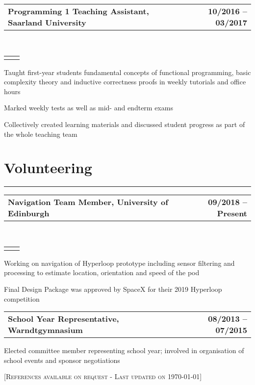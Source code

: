 \documentclass[]{deedy-resume}
\makeatletter
\newcommand{\headerrow}[2]
{\begin{tabular*}{\linewidth}{l@{\extracolsep{\fill}}r}
	\fontspec{Helvetica}\fontsize{12pt}{12pt}\selectfont\bfseries{\color{subheadings}#1} &
	\fontspec{Helvetica}\fontsize{12pt}{12pt}\selectfont\bfseries{\color{subheadings}#2} \\
\end{tabular*}}
\newcommand{\locationrow}[2]
{\begin{tabular*}{\linewidth}{l@{\extracolsep{\fill}}r}
        \color{headings}\scshape\fontspec{Heiti TC Medium}\fontsize{10pt}{12pt}\selectfont{#1}  &
        \color{headings}\scshape\fontspec{Heiti TC Medium}\fontsize{10pt}{12pt}\selectfont{#2}  \\
\end{tabular*}}
\makeatother
\begin{document}
\noindent
\headerrow{Programming 1 Teaching Assistant, Saarland University}{10/2016 -- 03/2017}
\\
\locationrow{Dependable Systems and Software Group}{}
\begin{tightitemize}{1.7em}
    \item Taught first-year students fundamental concepts of functional programming, basic complexity theory and inductive correctness proofs in weekly tutorials and office hours
    \item Marked weekly tests as well as mid- and endterm exams
    \item Collectively created learning materials and discussed student progress as part of the whole teaching team
\end{tightitemize}
\largesectionsep


\section*{Volunteering}
\hrule
\vspace{0.4em}

\noindent
\headerrow{Navigation Team Member, University of Edinburgh}{09/2018 -- Present}
\\
\locationrow{HYPED -- University of Edinburgh Hyperloop Society}{}
\begin{tightitemize}{1.7em}
    \item Working on navigation of Hyperloop prototype including sensor filtering and processing
    to estimate location, orientation and speed of the pod
    \item Final Design Package was approved by SpaceX for their 2019 Hyperloop competition
\end{tightitemize}
\largesectionsep


\noindent
\headerrow{School Year Representative, Warndtgymnasium}{08/2013 -- 07/2015}
\begin{tightitemize}{1.7em}
    \item Elected committee member representing school year; involved in organisation of school events and sponsor
    negotiations
\end{tightitemize}
\largesectionsep

[\scshape{}\fontsize{10pt}{8pt}\selectfont References available on request - Last updated on \today]
\end{document}
